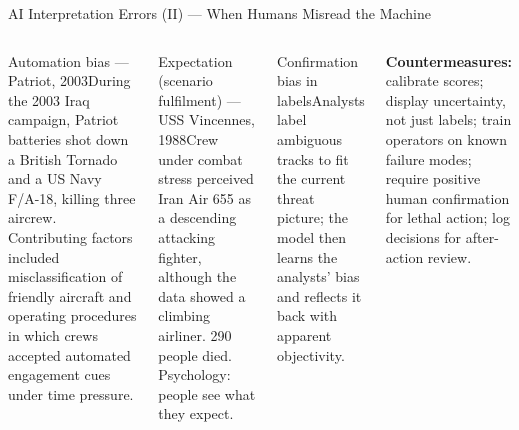 \documentclass[aspectratio=169,10pt,t]{beamer}
\begin{document}
\begin{frame}{AI Interpretation Errors (II) --- When Humans Misread the Machine}
\begin{columns}[T]
\begin{cbox}[ISSAred]{Automation bias --- Patriot, 2003}\scriptsize During the 2003 Iraq campaign, Patriot batteries shot down a British Tornado and a US Navy F/A-18, killing three aircrew. Contributing factors included misclassification of friendly aircraft and operating procedures in which crews accepted automated engagement cues under time pressure.\end{cbox}
\begin{cbox}[violet]{Expectation (scenario fulfilment) --- USS Vincennes, 1988}\scriptsize Crew under combat stress perceived Iran Air 655 as a descending attacking fighter, although the data showed a climbing airliner. 290 people died. Psychology: people see what they expect.\end{cbox}
\begin{cbox}[ISSAamb]{Confirmation bias in labels}\scriptsize Analysts label ambiguous tracks to fit the current threat picture; the model then learns the analysts' bias and reflects it back with apparent objectivity.\end{cbox}
\begin{rbox}\scriptsize\textbf{Countermeasures:} calibrate scores; display uncertainty, not just labels; train operators on known failure modes; require positive human confirmation for lethal action; log decisions for after-action review.\end{rbox}
\end{columns}
\end{frame}
\end{document}
